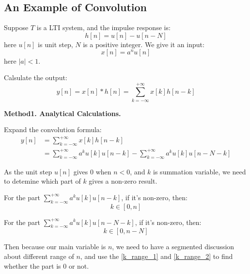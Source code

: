     \subsection{An Example of Convolution}
    Suppose $T$ is a LTI system, and the impulse response is:
        \begin{equation}
            h[n] = u[n] - u[n-N]
        \end{equation}
    here $u[n]$ is unit step, $N$ is a positive integer.
    We give it an input:
        \begin{equation}
            x[n] = a^nu[n]
        \end{equation}
    here $|a|<1$.

    Calsulate the output:
        \begin{equation}
            y[n] = x[n] \ast h[n] = \sum_{k=-\infty}^{+\infty} x[k]h[n-k]
        \end{equation}
    
    \noindent \textbf{Method1. Analytical Calculations.}

    Expand the convolution formula:
        \begin{equation}
            \begin{aligned}
            y[n] &= \sum_{k=-\infty}^{+\infty} x[k]h[n-k]\\
                 &= \sum_{k=-\infty}^{+\infty} a^ku[k]u[n-k] - \sum_{k=-\infty}^{+\infty}a^ku[k]u[n-N-k]
            \end{aligned}
        \end{equation}
    
    As the unit step $u[n]$ gives 0 when $n<0$, and $k$ is summation variable, we need to detemine which part of $k$ gives a non-zero result.

    For the part $\sum_{k=-\infty}^{+\infty} a^ku[k]u[n-k]$, if it's non-zero, then:
        \begin{equation} \label{k_range_1}
            k \in [0,n]
        \end{equation}

    For the part $\sum_{k=-\infty}^{+\infty} a^ku[k]u[n-N-k]$, if it's non-zero, then:
        \begin{equation}\label{k_range_2}
            k \in [0,n-N]
        \end{equation}
    
    Then because our main variable is $n$, we need to have a segmented discussion about different range of $n$, 
    and use the \eqref{k_range_1} and \eqref{k_range_2} to find whether the part is 0 or not.

